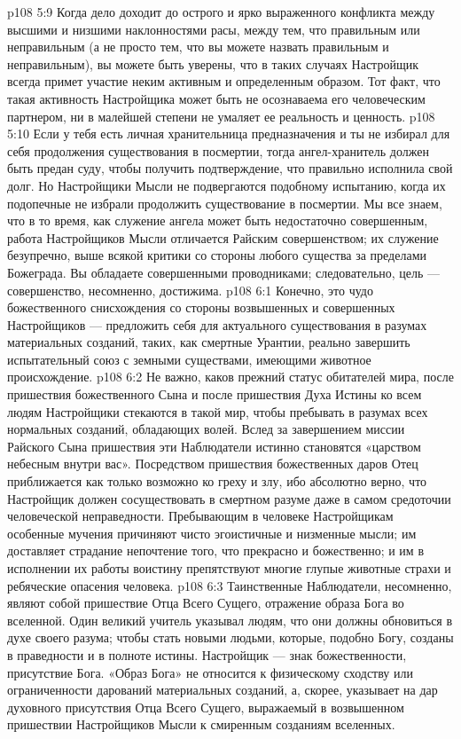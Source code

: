 \vs p108 5:9 Когда дело доходит до острого и ярко выраженного конфликта между высшими и низшими наклонностями расы, между тем, что  правильным или неправильным (а не просто тем, что вы можете назвать правильным и неправильным), вы можете быть уверены, что в таких случаях Настройщик всегда примет участие неким активным и определенным образом. Тот факт, что такая активность Настройщика может быть не осознаваема его человеческим партнером, ни в малейшей степени не умаляет ее реальность и ценность.
\vs p108 5:10 Если у тебя есть личная хранительница предназначения и ты не избирал для себя продолжения существования в посмертии, тогда ангел\hyp{}хранитель должен быть предан суду, чтобы получить подтверждение, что правильно исполнила свой долг. Но Настройщики Мысли не подвергаются подобному испытанию, когда их подопечные не избрали продолжить существование в посмертии. Мы все знаем, что в то время, как служение ангела может быть недостаточно совершенным, работа Настройщиков Мысли отличается Райским совершенством; их служение безупречно, выше всякой критики со стороны любого существа за пределами Божеграда. Вы обладаете совершенными проводниками; следовательно, цель --- совершенство, несомненно, достижима.
\vs p108 6:1 Конечно, это чудо божественного снисхождения со стороны возвышенных и совершенных Настройщиков --- предложить себя для актуального существования в разумах материальных созданий, таких, как смертные Урантии, реально завершить испытательный союз с земными существами, имеющими животное происхождение.
\vs p108 6:2 Не важно, каков прежний статус обитателей мира, после пришествия божественного Сына и после пришествия Духа Истины ко всем людям Настройщики стекаются в такой мир, чтобы пребывать в разумах всех нормальных созданий, обладающих волей. Вслед за завершением миссии Райского Сына пришествия эти Наблюдатели истинно становятся «царством небесным внутри вас». Посредством пришествия божественных даров Отец приближается как только возможно ко греху и злу, ибо абсолютно верно, что Настройщик должен сосуществовать в смертном разуме даже в самом средоточии человеческой неправедности. Пребывающим в человеке Настройщикам особенные мучения причиняют чисто эгоистичные и низменные мысли; им доставляет страдание непочтение того, что прекрасно и божественно; и им в исполнении их работы воистину препятствуют многие глупые животные страхи и ребяческие опасения человека.
\vs p108 6:3 \pc Таинственные Наблюдатели, несомненно, являют собой пришествие Отца Всего Сущего, отражение образа Бога во вселенной. Один великий учитель указывал людям, что они должны обновиться в духе своего разума; чтобы стать новыми людьми, которые, подобно Богу, созданы в праведности и в полноте истины. Настройщик --- знак божественности, присутствие Бога. «Образ Бога» не относится к физическому сходству или ограниченности дарований материальных созданий, а, скорее, указывает на дар духовного присутствия Отца Всего Сущего, выражаемый в возвышенном пришествии Настройщиков Мысли к смиренным созданиям вселенных.
